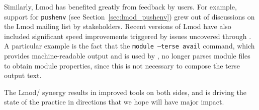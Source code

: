 Similarly, Lmod has benefited greatly from feedback by \easybuild{} users.
For example, support for \texttt{pushenv} (see
Section~\ref{sec:lmod_pushenv}) grew out of discussions on the Lmod
mailing list by \easybuild{} stakeholders. Recent versions of Lmod
have also included significant speed improvements triggered by issues
uncovered through \easybuild{}. A particular example is the fact that
the \texttt{module --terse avail} command, which provides machine-readable output and
is used by \easybuild{}, no longer parses module files to obtain module properties,
since this is not necessary to compose the terse output text.

The Lmod/\easybuild{} synergy results in improved tools on both sides,
and is driving the state of the practice in directions that we hope will
have major impact.
